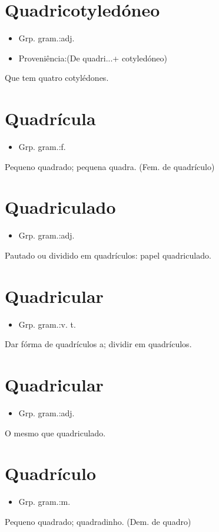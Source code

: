 \section{Quadricotyledóneo}
\begin{itemize}
\item {Grp. gram.:adj.}
\end{itemize}
\begin{itemize}
\item {Proveniência:(De \textunderscore quadri...\textunderscore  + \textunderscore cotyledóneo\textunderscore )}
\end{itemize}
Que tem quatro cotylédones.
\section{Quadrícula}
\begin{itemize}
\item {Grp. gram.:f.}
\end{itemize}
Pequeno quadrado; pequena quadra.
(Fem. de \textunderscore quadrículo\textunderscore )
\section{Quadriculado}
\begin{itemize}
\item {Grp. gram.:adj.}
\end{itemize}
Pautado ou dividido em quadrículos: \textunderscore papel quadriculado\textunderscore .
\section{Quadricular}
\begin{itemize}
\item {Grp. gram.:v. t.}
\end{itemize}
Dar fórma de quadrículos a; dividir em quadrículos.
\section{Quadricular}
\begin{itemize}
\item {Grp. gram.:adj.}
\end{itemize}
O mesmo que \textunderscore quadriculado\textunderscore .
\section{Quadrículo}
\begin{itemize}
\item {Grp. gram.:m.}
\end{itemize}
Pequeno quadrado; quadradinho.
(Dem. de \textunderscore quadro\textunderscore )
